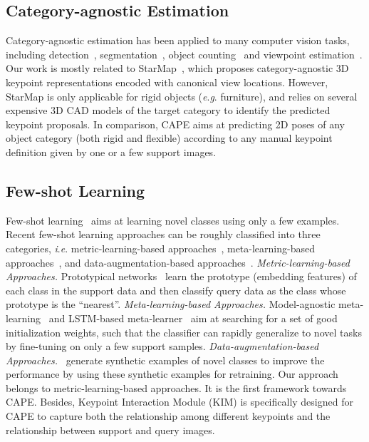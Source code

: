 \documentclass[runningheads]{llncs}
\newcommand{\ie}{\textit{i}.\textit{e}. }
\newcommand{\eg}{\textit{e}.\textit{g}. }
\begin{document}
\subsection{Category-agnostic Estimation}
Category-agnostic estimation has been applied to many computer vision tasks, including detection~\cite{jiang2019class}, segmentation~\cite{zhang2019canet}, object counting~\cite{lu2018class,yang2021class} and viewpoint estimation~\cite{zhou2018starmap}. 
Our work is mostly related to StarMap~\cite{zhou2018starmap}, which proposes category-agnostic 3D keypoint representations encoded with canonical view locations. However, StarMap is only applicable for rigid objects (\eg furniture), and relies on several expensive 3D CAD models of the target category to identify the predicted keypoint proposals. In comparison, CAPE aims at predicting 2D poses of any object category (both rigid and flexible) according to any manual keypoint definition given by one or a few support images.

\subsection{Few-shot Learning}
Few-shot learning~\cite{lu2020learning} aims at learning novel classes using only a few examples. 
Recent few-shot learning approaches can be roughly classified into three categories, \ie metric-learning-based approaches~\cite{snell2017prototypical,vinyals2016matching,yang2018learning}, meta-learning-based approaches~\cite{finn2017model,ravi2016optimization}, and data-augmentation-based approaches~\cite{hariharan2017low}. 
\emph{Metric-learning-based Approaches.}
Prototypical networks~\cite{snell2017prototypical} learn the prototype (embedding features) of each class in the support data and then classify query data as the class whose prototype is the “nearest”.
\emph{Meta-learning-based Approaches.}
Model-agnostic meta-learning~\cite{finn2017model} and LSTM-based meta-learner~\cite{ravi2016optimization} aim at searching for a set of good initialization weights, such that the classifier can rapidly generalize to novel tasks by fine-tuning on only a few support samples. 
\emph{Data-augmentation-based Approaches.}~\cite{hariharan2017low,wang2018low} generate synthetic examples of novel classes to improve the performance by using these synthetic examples for retraining. Our approach belongs to metric-learning-based approaches. It is the first framework towards CAPE. Besides, Keypoint Interaction Module (KIM) is specifically designed for CAPE to capture both the relationship among different keypoints and the relationship between support and query images.
\end{document}
